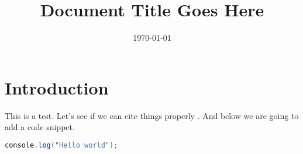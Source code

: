 \documentclass[12pt,twoside]{article}
\title{Document Title Goes Here \\
  }
\author{}
\date{\today}
\begin{document}
\maketitle

\tableofcontents
\listoffigures
\lstlistoflistings



\section{Introduction}

This is a test. Let's see if we can cite things properly
\cite{theref}. And below we are going to add a code
snippet.


\begin{lstlisting}[language=Java,caption="This is a simple Javascript program"]
  console.log("Hello world");
\end{lstlisting}



\end{document}

